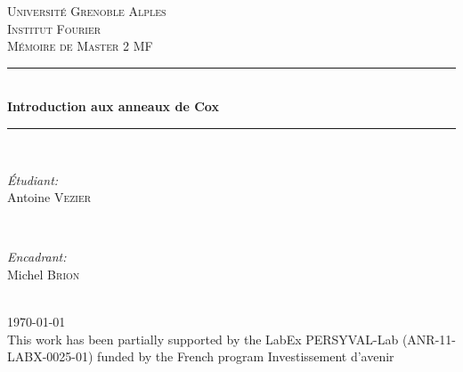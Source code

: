 \documentclass[oneside, 10pt]{book}
\begin{document}
\begin{titlepage}

\newcommand{\HRule}{\rule{\linewidth}{0.5mm}} %

\center

\textsc{\LARGE Université Grenoble Alples}\\[0.5cm] 
\textsc{\large Institut Fourier}\\[1.5cm] 

\textsc{\Large Mémoire de Master 2 MF}\\[2.5cm] 

\HRule \\[0.4cm]
{ \huge \bfseries Introduction aux anneaux de Cox}\\[0.4cm] 
\HRule \\[1.5cm]

\begin{minipage}{0.4\textwidth}
\begin{flushleft} \large
\emph{Étudiant:}\\
Antoine \textsc{Vezier} 
\end{flushleft}
\end{minipage}
~
\begin{minipage}{0.4\textwidth}
\begin{flushright} \large
\emph{Encadrant:} \\
Michel \textsc{Brion} 
\end{flushright}
\end{minipage}\\[2cm]

{\large \today}\\[8cm] 


{\large This work has been partially supported by the LabEx PERSYVAL-Lab (ANR-11-LABX-0025-01) funded by the French program Investissement d’avenir
}\\[1cm] 

 
\vfill %

\end{titlepage}

\tableofcontents






\nocite{*}



\end{document}
